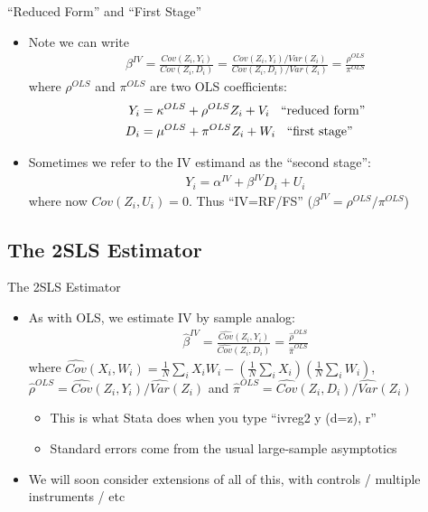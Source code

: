\documentclass{beamer}
\begin{document}
\begin{frame}{``Reduced Form'' and ``First Stage''}
\begin{itemize}
\item Note we can write 
\begin{align*}
\beta^{IV}=\frac{Cov(Z_i,Y_i)}{Cov(Z_i,D_i)}=\frac{Cov(Z_i,Y_i)/Var(Z_i)}{Cov(Z_i,D_i)/Var(Z_i)}=\frac{\rho^{OLS}}{\pi^{OLS}}
\end{align*}
where $\rho^{OLS}$ and $\pi^{OLS}$ are two OLS coefficients:\pause{}
\begin{align*}
Y_i &= \kappa^{OLS} + \rho^{OLS} Z_i + V_i \hspace{0.2cm}\text{ ``reduced form''}\\
D_i &= \mu^{OLS} + \pi^{OLS} Z_i + W_i\hspace{0.2cm}\text{ ``first stage''}
\end{align*}\vspace{-0.5cm}\pause{}
\item Sometimes we refer to the IV estimand as the ``second stage'':
\begin{align*}
Y_i=\alpha^{IV}+\beta^{IV}D_i+ U_i
\end{align*}
where now $Cov(Z_i,U_i)=0$. Thus ``IV=RF/FS'' ($\beta^{IV}=\rho^{OLS}/\pi^{OLS}$)
\end{itemize}
\end{frame}

\subsection{The 2SLS Estimator}
\begin{frame}{The 2SLS Estimator}
\begin{itemize}
\item As with OLS, we estimate IV by sample analog:
\begin{align*}
\widehat\beta^{IV}=\frac{\widehat{Cov}(Z_i,Y_i)}{\widehat{Cov}(Z_i,D_i)}=\frac{\widehat\rho^{OLS}}{\widehat\pi^{OLS}}
\end{align*}
where $\widehat{Cov}(X_i,W_i)=\frac{1}{N}\sum_i X_iW_i-\left(\frac{1}{N}\sum_i X_i\right)\left(\frac{1}{N}\sum_i W_i\right)$,\\ $\hat\rho^{OLS}=\widehat{Cov}(Z_i,Y_i)/\widehat{Var}(Z_i)$ and $\hat\pi^{OLS}=\widehat{Cov}(Z_i,D_i)/\widehat{Var}(Z_i)$\smallskip
\begin{itemize}\pause{}
\item This is what Stata does when you type ``ivreg2 y (d=z), r''\smallskip
\item Standard errors come from the usual large-sample asymptotics
\end{itemize}\bigskip\pause{}
\item We will soon consider extensions of all of this, with controls / multiple instruments / etc
\end{itemize}

\end{frame}
\end{document}
